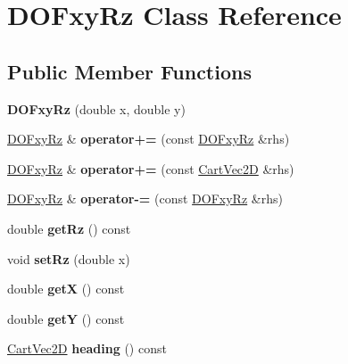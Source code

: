 \hypertarget{class_d_o_fxy_rz}{}\section{D\+O\+Fxy\+Rz Class Reference}
\label{class_d_o_fxy_rz}
\subsection*{Public Member Functions}
\begin{DoxyCompactItemize}
\item 
{\bfseries D\+O\+Fxy\+Rz} (double x, double y)\hypertarget{class_d_o_fxy_rz_a6f464ff9fa12b2d66c93415f079a003d}{}\label{class_d_o_fxy_rz_a6f464ff9fa12b2d66c93415f079a003d}

\item 
\hyperlink{class_d_o_fxy_rz}{D\+O\+Fxy\+Rz} \& {\bfseries operator+=} (const \hyperlink{class_d_o_fxy_rz}{D\+O\+Fxy\+Rz} \&rhs)\hypertarget{class_d_o_fxy_rz_a043e442de5d6442ed7e582b9d5507b82}{}\label{class_d_o_fxy_rz_a043e442de5d6442ed7e582b9d5507b82}

\item 
\hyperlink{class_d_o_fxy_rz}{D\+O\+Fxy\+Rz} \& {\bfseries operator+=} (const \hyperlink{class_cart_vec2_d}{Cart\+Vec2D} \&rhs)\hypertarget{class_d_o_fxy_rz_a082af42b93a681708dec738e844356d8}{}\label{class_d_o_fxy_rz_a082af42b93a681708dec738e844356d8}

\item 
\hyperlink{class_d_o_fxy_rz}{D\+O\+Fxy\+Rz} \& {\bfseries operator-\/=} (const \hyperlink{class_d_o_fxy_rz}{D\+O\+Fxy\+Rz} \&rhs)\hypertarget{class_d_o_fxy_rz_ac6c8ca46b06727c79aa454ccbeb89b19}{}\label{class_d_o_fxy_rz_ac6c8ca46b06727c79aa454ccbeb89b19}

\item 
double {\bfseries get\+Rz} () const \hypertarget{class_d_o_fxy_rz_ac82d85d1f14b1ee58df06cf3b3d15c17}{}\label{class_d_o_fxy_rz_ac82d85d1f14b1ee58df06cf3b3d15c17}

\item 
void {\bfseries set\+Rz} (double x)\hypertarget{class_d_o_fxy_rz_a1d9e60f0b34ead75b5bd08a18a3d3bc3}{}\label{class_d_o_fxy_rz_a1d9e60f0b34ead75b5bd08a18a3d3bc3}

\item 
double {\bfseries getX} () const \hypertarget{class_d_o_fxy_rz_a9f40a00c3ac6b7d0bb5e6dff8e5505fe}{}\label{class_d_o_fxy_rz_a9f40a00c3ac6b7d0bb5e6dff8e5505fe}

\item 
double {\bfseries getY} () const \hypertarget{class_d_o_fxy_rz_a9e61abd80baaefc6969d2d5264840365}{}\label{class_d_o_fxy_rz_a9e61abd80baaefc6969d2d5264840365}

\item 
\hyperlink{class_cart_vec2_d}{Cart\+Vec2D} {\bfseries heading} () const \hypertarget{class_d_o_fxy_rz_a6b53b0cecd56e675e5f48e34a68d11e4}{}\label{class_d_o_fxy_rz_a6b53b0cecd56e675e5f48e34a68d11e4}

\end{DoxyCompactItemize}
